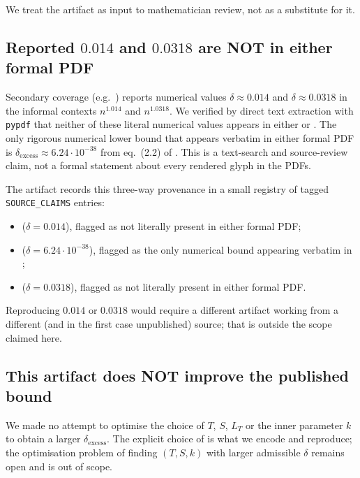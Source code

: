 We treat the artifact as input to mathematician review, not as a
substitute for it.

\subsection{Reported $0.014$ and $0.0318$ are NOT in either formal PDF}

Secondary coverage (e.g.\ \cite{KalaiBlog2026}) reports numerical
values $\delta \approx 0.014$ and $\delta \approx 0.0318$ in the
informal contexts $n^{1.014}$ and $n^{1.0318}$. We verified by direct
text extraction with \texttt{pypdf} that neither of these literal
numerical values appears in either
\cite{OpenAI2026Proof} or \cite{Sawin2026Remarks}. The only rigorous
numerical lower bound that appears verbatim in either formal PDF is
$\delta_{\text{excess}} \approx 6.24 \cdot 10^{-38}$ from eq.~(2.2) of
\cite{Sawin2026Remarks}. This is a text-search and source-review claim,
not a formal statement about every rendered glyph in the PDFs.

The artifact records this three-way provenance in a small registry
of tagged \texttt{SOURCE\_CLAIMS} entries:

\begin{itemize}[leftmargin=*]
  \item {} ($\delta = 0.014$), flagged as
        not literally present in either formal PDF;
  \item {}
        ($\delta = 6.24 \cdot 10^{-38}$), flagged as the only
        numerical bound appearing verbatim in
        \cite{Sawin2026Remarks};
  \item {} ($\delta = 0.0318$),
        flagged as not literally present in either formal PDF.
\end{itemize}

Reproducing $0.014$ or $0.0318$ would require a different artifact
working from a different (and in the first case unpublished) source;
that is outside the scope claimed here.

\subsection{This artifact does NOT improve the published bound}

We made no attempt to optimise the choice of $T$, $S$, $L_T$ or the
inner parameter $k$ to obtain a larger $\delta_{\text{excess}}$. The
explicit choice of \cite[\S2.1]{Sawin2026Remarks} is what we encode and
reproduce; the optimisation problem of finding $(T, S, k)$ with larger
admissible $\delta$ remains open and is out of scope.
